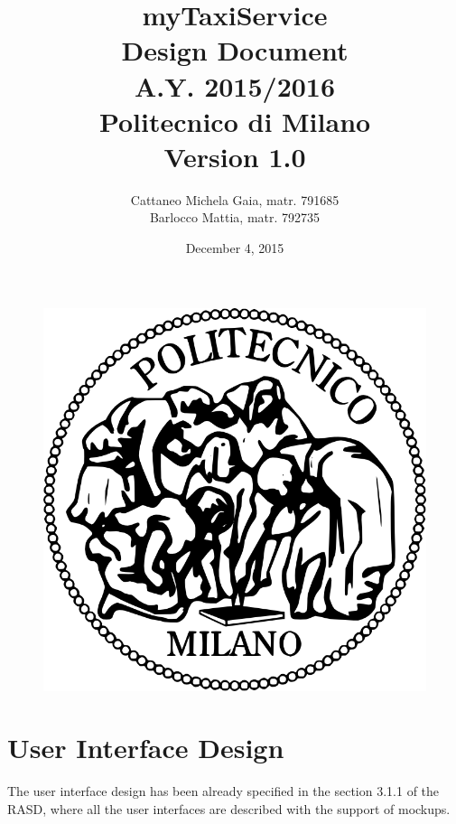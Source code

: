\documentclass[18pt,oneside,a4paper, titlepage]{article}
\begin{document}
\begin{figure}[t]
	\centering
	\includegraphics[scale=0.35]{logo-polimi.png}
\end{figure}
\title{\textbf{myTaxiService}\\\textbf{D}esign \textbf{D}ocument\\ A.Y. 2015/2016\\
	Politecnico di Milano \\ Version 1.0}	
\author{Cattaneo Michela Gaia, matr. 791685\\Barlocco Mattia, matr. 792735 }
\date{December 4, 2015}
\maketitle

\newpage
	\tableofcontents

\newpage
	
		
	
\newpage	
	\section{User Interface Design}
		The user interface design has been already specified in the section 3.1.1 of the RASD, where all the user interfaces are described with the support of mockups.
\newpage
\end{document}
